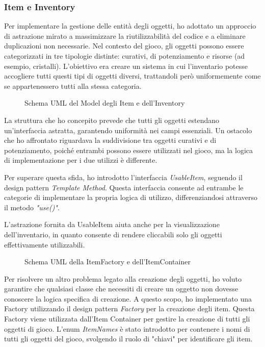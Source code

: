 \documentclass[a4paper,12pt]{report}
\begin{document}
\subsubsection{Item e Inventory}

Per implementare la gestione delle entità degli oggetti, ho adottato un approccio di astrazione mirato a massimizzare la riutilizzabilità del codice e a eliminare duplicazioni non necessarie. Nel contesto del gioco, gli oggetti possono essere categorizzati in tre tipologie distinte: curativi, di potenziamento e risorse (ad esempio, cristalli).
L'obiettivo era creare un sistema in cui l'inventario potesse accogliere tutti questi tipi di oggetti diversi, trattandoli però uniformemente come se appartenessero tutti alla stessa categoria.
\begin{figure}[H]
	\centering
	
	\caption{Schema UML del Model degli Item e dell'Inventory}
	\label{fig:the-exiled-item-uml}
\end{figure}

La struttura che ho concepito prevede che tutti gli oggetti estendano un'interfaccia astratta, garantendo uniformità nei campi essenziali. Un ostacolo che ho affrontato riguardava la suddivisione tra oggetti curativi e di potenziamento, poiché entrambi possono essere utilizzati nel gioco, ma la logica di implementazione per i due utilizzi è differente.

Per superare questa sfida, ho introdotto l'interfaccia \textit{UsableItem}, seguendo il design pattern \textit{Template Method}. Questa interfaccia consente ad entrambe le categorie di implementare la propria logica di utilizzo, differenziandosi attraverso il metodo \textit{"use()"}.

L'astrazione fornita da UsableItem aiuta anche per la visualizzazione dell'inventario, in quanto consente di rendere cliccabili solo gli oggetti effettivamente utilizzabili.

\begin{figure}[H]
	\centering
	
	\caption{Schema UML della ItemFactory e dell'ItemContainer}
	\label{fig:the-exiled-itemFactory_itemContainer-uml}
\end{figure}

Per risolvere un altro problema legato alla creazione degli oggetti, ho voluto garantire che qualsiasi classe che necessiti di creare un oggetto non dovesse conoscere la logica specifica di creazione. A questo scopo, ho implementato una Factory utilizzando il design pattern \textit{Factory} per la creazione degli item. Questa Factory viene utilizzata dall'Item Container per gestire la creazione di tutti gli oggetti di gioco. L'enum \textit{ItemNames} è stato introdotto per contenere i nomi di tutti gli oggetti del gioco, svolgendo il ruolo di "chiavi" per identificare gli item.
\end{document}

